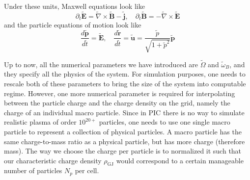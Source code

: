 Under these units, Maxwell equations look like
\begin{equation}
  \partial_t \tilde{\mathbf{E}} = \tilde{\nabla}\times \tilde{\mathbf{B}} - \tilde{\mathbf{j}},\quad \partial_t \tilde{\mathbf{B}} = - \tilde{\nabla}\times \tilde{\mathbf{E}}
\end{equation}
and the particle equations of motion look like
\begin{equation}
  \frac{d \tilde{\mathbf{p}}}{d \tilde{t}} = \tilde{\mathbf{E}},\quad \frac{d \tilde{\mathbf{r}}}{d \tilde{t}} = \tilde{\mathbf{u}} = \frac{\tilde{p}}{\sqrt{1 + \tilde{p}^2}} \tilde{\mathbf{p}}
\end{equation}

Up to now, all the numerical parameters we have introduced are $\tilde{\Omega}$
and $\tilde{\omega}_B$, and they specify all the physics of the system. For
simulation purposes, one needs to rescale both of these parameters to bring the
size of the system into computable regime. However, one more numerical parameter
is required for interpolating between the particle charge and the charge density
on the grid, namely the charge of an individual macro particle. Since in PIC
there is no way to simulate realistic plasma of order $10^{20+}$ particles, one
needs to use one single macro particle to represent a collection of physical
particles. A macro particle has the same charge-to-mass ratio as a physical
particle, but has more charge (therefore mass). The way we choose the charge per
particle is to normalized it such that our characteristic charge density
$\rho_\mathrm{GJ}$ would correspond to a certain manageable number of particles $N_p$
per cell.


